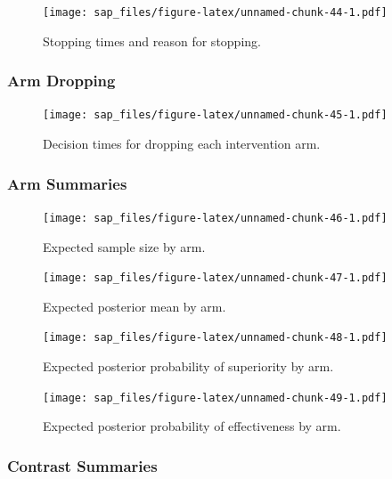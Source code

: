 \documentclass[
  bibliography=totoc]{scrreprt}
\begin{document}
\begin{figure}
\centering
\texttt{[image: sap\_files/figure-latex/unnamed-chunk-44-1.pdf]}
\caption{\label{fig:unnamed-chunk-44}Stopping times and reason for stopping.}
\end{figure}

\clearpage

\hypertarget{arm-dropping-3}{%
\subsubsection{Arm Dropping}\label{arm-dropping-3}}

\begin{figure}
\centering
\texttt{[image: sap\_files/figure-latex/unnamed-chunk-45-1.pdf]}
\caption{\label{fig:unnamed-chunk-45}Decision times for dropping each intervention arm.}
\end{figure}

\clearpage

\hypertarget{arm-summaries-3}{%
\subsubsection{Arm Summaries}\label{arm-summaries-3}}

\begin{figure}
\centering
\texttt{[image: sap\_files/figure-latex/unnamed-chunk-46-1.pdf]}
\caption{\label{fig:unnamed-chunk-46}Expected sample size by arm.}
\end{figure}

\begin{figure}
\centering
\texttt{[image: sap\_files/figure-latex/unnamed-chunk-47-1.pdf]}
\caption{\label{fig:unnamed-chunk-47}Expected posterior mean by arm.}
\end{figure}

\begin{figure}
\centering
\texttt{[image: sap\_files/figure-latex/unnamed-chunk-48-1.pdf]}
\caption{\label{fig:unnamed-chunk-48}Expected posterior probability of superiority by arm.}
\end{figure}

\begin{figure}
\centering
\texttt{[image: sap\_files/figure-latex/unnamed-chunk-49-1.pdf]}
\caption{\label{fig:unnamed-chunk-49}Expected posterior probability of effectiveness by arm.}
\end{figure}

\clearpage

\hypertarget{contrast-summaries-3}{%
\subsubsection{Contrast Summaries}\label{contrast-summaries-3}}
\end{document}
